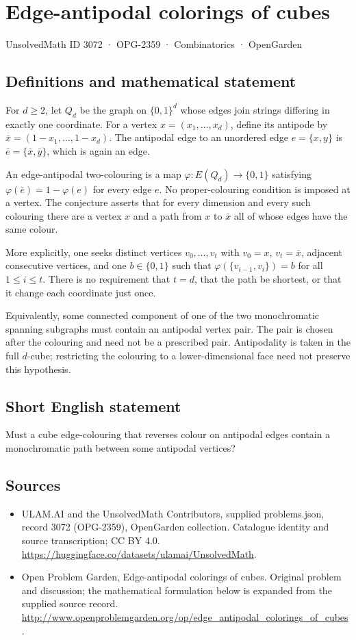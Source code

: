 \documentclass[11pt,a4paper]{article}
\begin{document}
\section*{Edge-antipodal colorings of cubes}\label{3072}
{\small UnsolvedMath ID 3072 · OPG-2359 · Combinatorics · OpenGarden}
\subsection{Definitions and mathematical statement}
For $d\ge2$, let $Q_d$ be the graph on $\{0,1\}^d$ whose edges join
strings differing in exactly one coordinate. For a vertex
$x=(x_1,\ldots,x_d)$, define its antipode by
$\bar x=(1-x_1,\ldots,1-x_d)$. The antipodal edge to an unordered edge
$e=\{x,y\}$ is $\bar e=\{\bar x,\bar y\}$, which is again an edge.

An edge-antipodal two-colouring is a map
$\varphi:E(Q_d)\to\{0,1\}$ satisfying
$\varphi(\bar e)=1-\varphi(e)$ for every edge $e$.
No proper-colouring condition is imposed at a vertex.
The conjecture asserts that for every dimension and every such colouring
there are a vertex $x$ and a path from $x$ to $\bar x$ all of whose edges
have the same colour.

More explicitly, one seeks distinct vertices
$v_0,\ldots,v_t$ with $v_0=x$, $v_t=\bar x$, adjacent consecutive
vertices, and one $b\in\{0,1\}$ such that
$\varphi(\{v_{i-1},v_i\})=b$ for all $1\le i\le t$.
There is no requirement that $t=d$, that the path be shortest, or that
it change each coordinate just once.

Equivalently, some connected component of one of the two monochromatic
spanning subgraphs must contain an antipodal vertex pair. The pair is
chosen after the colouring and need not be a prescribed pair. Antipodality
is taken in the full $d$-cube; restricting the colouring to a lower-dimensional
face need not preserve this hypothesis.
\subsection{Short English statement}
Must a cube edge-colouring that reverses colour on antipodal edges contain a monochromatic path between some antipodal vertices?
\subsection{Sources}
\begin{itemize}
\item[S1] ULAM.AI and the UnsolvedMath Contributors, supplied problems.json, record 3072 (OPG-2359), OpenGarden collection. Catalogue identity and source transcription; CC BY 4.0.
\url{https://huggingface.co/datasets/ulamai/UnsolvedMath}.
\item[S2] Open Problem Garden, Edge-antipodal colorings of cubes. Original problem and discussion; the mathematical formulation below is expanded from the supplied source record.
\url{http://www.openproblemgarden.org/op/edge_antipodal_colorings_of_cubes}.
\end{itemize}
\end{document}
